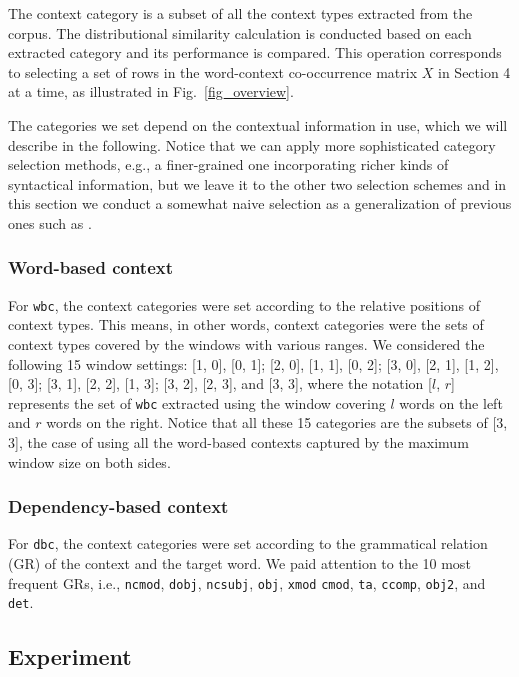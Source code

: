 \documentclass[english]{jnlp_1.4}
\begin{document}
The context category is a subset of all the context types extracted
from the corpus. The distributional similarity calculation is
conducted based on each extracted category and its performance is
compared. This operation corresponds to selecting a set of rows in the
word-context co-occurrence matrix $X$ in Section 4 at a time, as
illustrated in Fig.~\ref{fig_overview}.

The categories we set depend on the contextual information in use,
which we will describe in the following. Notice that we can apply more
sophisticated category selection methods, e.g., a finer-grained one
incorporating richer kinds of syntactical information, but we leave it
to the other two selection schemes and in this section we conduct a
somewhat naive selection as a generalization of previous ones such as
\cite{Hindle:90}.


\subsubsection{Word-based context}

For {\tt wbc}, the context categories were set according to the
relative positions of context types. This means, in other words,
context categories were the sets of context types covered by the
windows with various ranges. We considered the following 15 window
settings: [1, 0], [0, 1]; [2, 0], [1, 1], [0, 2]; [3, 0], [2, 1], [1,
2], [0, 3]; [3, 1], [2, 2], [1, 3]; [3, 2], [2, 3], and [3, 3], where
the notation [$l$, $r$] represents the set of {\tt wbc} extracted
using the window covering $l$ words on the left and $r$ words on the
right. Notice that all these 15 categories are the subsets of [3, 3],
the case of using all the word-based contexts captured by the maximum
window size on both sides.

\subsubsection{Dependency-based context}

For {\tt dbc}, the context categories were set according to the
grammatical relation (GR) of the context and the target word. We paid
attention to the 10 most frequent GRs, i.e., {\tt ncmod}, {\tt dobj},
{\tt ncsubj}, {\tt obj}, {\tt xmod} {\tt cmod}, {\tt ta}, {\tt ccomp},
{\tt obj2}, and {\tt det}.

\subsection{Experiment}
\end{document}
